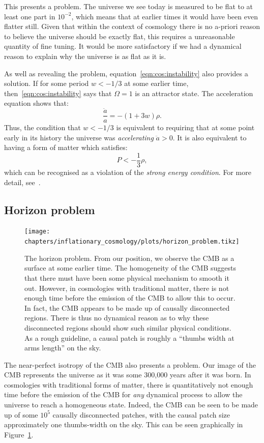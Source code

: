 This presents a problem. The universe we see today is measured to be flat to at least one part in \(10^{-2}\), which means that at earlier times it would have been even flatter still. Given that within the context of cosmology there is no a-priori reason to believe the universe should be exactly flat, this requires a unreasonable quantity of fine tuning. It would be more satisfactory if we had a dynamical reason to explain why the universe is as flat as it is.

As well as revealing the problem, equation~\eqref{eqn:cos:instability} also provides a solution. If for some period \(w<-1/3\) at some earlier time, then~\eqref{eqn:cos:instability} says that \(\Omega=1\) is an attractor state. The acceleration equation shows that:
\begin{equation}
  \frac{\ddot{a}}{a} = -(1+3w)\rho.
  \label{eqn:cos:Raychaudhuri_acc}
\end{equation}
Thus, the condition that \(w<-1/3\) is equivalent to requiring that at some point early in its history the universe was {\em accelerating\/} \(\ddot{a}>0\). It is also equivalent to having a form of matter which satisfies:
\begin{equation}
  P < -\frac{1}{3}\rho,
  \label{eqn:cos:SEC_violation}
\end{equation}
which can be recognised as a violation of the {\em strong energy condition}. For more detail, see~\cite{SEC_violation}.

\subsection{Horizon problem}
\label{sec:horizon_problem}
\begin{figure}[tp]
  \centering
  \texttt{[image: chapters/inflationary\_cosmology/plots/horizon\_problem.tikz]}
  \caption{The horizon problem. From our position, we observe the CMB as a surface at some earlier time. The homogeneity of the CMB suggests that there must have been some physical mechanism to smooth it out. However, in cosmologies with traditional matter, there is not enough time before the emission of the CMB to allow this to occur. In fact, the CMB appears to be made up of causally disconnected regions. There is thus no dynamical reason as to why these disconnected regions should show such similar physical conditions. As a rough guideline, a causal patch is roughly a ``thumbs width at arms length'' on the sky.}\label{fig:cos:horizon_problem}
\end{figure}
The near-perfect isotropy of the CMB also presents a problem. Our image of the CMB represents the universe as it was some 300,000 years after it was born. In cosmologies with traditional forms of matter, there is quantitatively not enough time before the emission of the CMB for {\em any\/} dynamical process to allow the universe to reach a homogeneous state. Indeed, the CMB can be seen to be made up of some \(10^{5}\) causally disconnected patches, with the causal patch size approximately one thumbs-width on the sky. This can be seen graphically in Figure~\ref{fig:cos:horizon_problem}.

